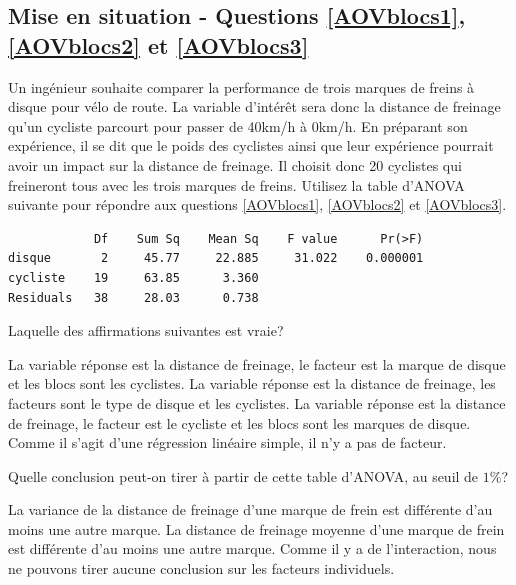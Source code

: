 \begin{questions}
\section*{Mise en situation - Questions \ref{AOVblocs1}, \ref{AOVblocs2} et \ref{AOVblocs3}}
Un ingénieur souhaite comparer la performance de trois marques de freins à disque pour vélo de route. La variable d'intérêt sera donc la distance de freinage qu'un cycliste parcourt pour passer de 40km/h à 0km/h. En préparant son expérience, il se dit que le poids des cyclistes ainsi que leur expérience pourrait avoir un impact sur la distance de freinage. Il choisit donc 20 cyclistes qui freineront tous avec les trois marques de freins. Utilisez la table d'ANOVA suivante pour répondre aux questions \ref{AOVblocs1}, \ref{AOVblocs2} et \ref{AOVblocs3}.
\begin{verbatim}
            Df    Sum Sq    Mean Sq    F value      Pr(>F)    
disque       2     45.77     22.885     31.022    0.000001
cycliste    19     63.85      3.360    
Residuals   38     28.03      0.738      
\end{verbatim}

\question[3]\label{AOVblocs1} Laquelle des affirmations suivantes est vraie?

\begin{checkboxes}
    \correctchoice La variable réponse est la distance de freinage, le facteur est la marque de disque et les blocs sont les cyclistes.
\choice La variable réponse est la distance de freinage, les facteurs sont le type de disque et les cyclistes.
\choice La variable réponse est la distance de freinage, le facteur est le cycliste et les blocs sont les marques de disque.
\choice Comme il s'agit d'une régression linéaire simple, il n'y a pas de facteur.
\end{checkboxes}

\vspace{0.5cm}
\question[3]\label{AOVblocs2} Quelle conclusion peut-on tirer à partir de cette table d'ANOVA, au seuil de $1\%$?

\begin{checkboxes}
    \choice La variance de la distance de freinage d'une marque de frein est différente d'au moins une autre marque.
\correctchoice La distance de freinage moyenne d'une marque de frein est différente d'au moins une autre marque.
\choice Comme il y a de l'interaction, nous ne pouvons tirer aucune conclusion sur les facteurs individuels.
\end{checkboxes}



\end{questions}
